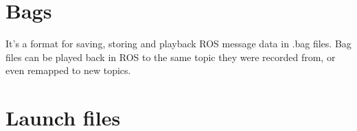         






    \section{Bags}
        It’s a format for saving, storing and playback ROS message data in .bag files.
        Bag files can be played back in ROS to the same topic they were recorded from, or even remapped to new topics.

    

    \section{Launch files}




        

